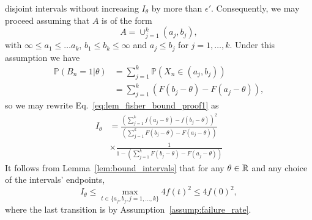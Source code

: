 \begin{proof-of-lemma}[\ref{lem:fisher_bound}]
  disjoint intervals without increasing $I_\theta$ by more than
  $\epsilon'$. Consequently, we may proceed assuming that
  $A$ is of the form
  \begin{equation*}
    A = \cup_{j=1}^k (a_j,b_j),
  \end{equation*}
  with $\infty \leq a_1 \leq \ldots a_k$, $b_1 \leq b_k \leq \infty$ and $a_j \leq b_j$ for $j=1,\ldots,k$. Under this assumption we have
  \begin{align*}
    \mathbb P(B_n=1| \theta) & = \sum_{j=1}^k \mathbb P\left(X_n \in (a_j,b_j) \right)  \\
    & = \sum_{j=1}^k \left( F \left(b_j-\theta\right) -  F \left(a_j-\theta\right)  \right),
  \end{align*}
  so we may rewrite Eq.~\eqref{eq:lem_fisher_bound_proof1} as
  \begin{align*}
    I_\theta & =   \frac { \left( \sum_{j=1}^{k} f \left(a_j-\theta \right) - f \left( b_j-\theta \right)  \right)^2 } 
    { \left( \sum_{j=1}^k F \left( b_j-\theta \right) - F \left( a_j-\theta \right)  \right) }  \nonumber \\
    & \times \frac {1} 
    {1- \left( \sum_{j=1}^k F \left(  b_j-\theta \right) - F \left( a_j-\theta \right)  \right) } 
  \end{align*}
  It follows from Lemma~\ref{lem:bound_intervals} that for any $\theta \in
  \mathbb{R}$ and any choice of the intervals' endpoints,
  \begin{equation*}
    I_\theta \le
    \max_{t \in \{a_j,b_j, j=1,\ldots,k\} } 4f(t)^2 \leq 4 f(0)^2, 
  \end{equation*}
  where the last transition is by Assumption~\ref{assump:failure_rate}. 
\end{proof-of-lemma}



